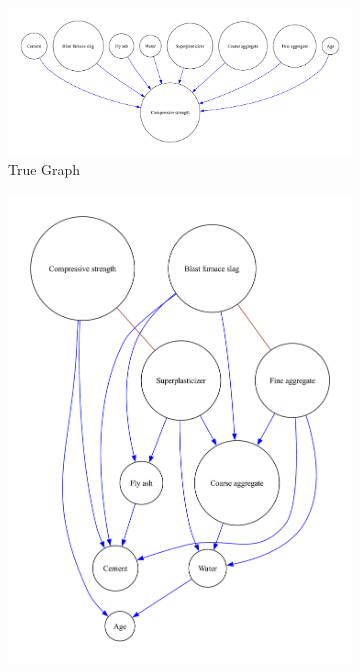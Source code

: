 \documentclass{article}
\begin{document}
\begin{figure}[H]
    \centering
    \begin{subfigure}{0.3\textwidth}
        \centering
        \vspace{-0.5cm}
        \includegraphics[width=\linewidth]{data/dataset/CCS_Data/output_graph/true_graph.pdf}
        \vfill
        \caption{True Graph}
        \label{fig:sub1}
    \end{subfigure}
    \hspace{0.04\textwidth}
    \begin{subfigure}{0.3\textwidth}
        \centering
        \vspace{-0.5cm}
        \includegraphics[width=\linewidth]{data/dataset/CCS_Data/output_graph/initial_graph.pdf}

\end{subfigure}
\end{figure}
\end{document}
